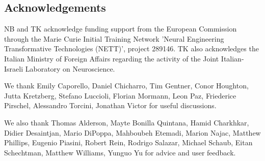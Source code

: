 \documentclass[10pt,twocolumn]{elsart5p}
\begin{document}
\begin{thanks}
\section{\label{s:Acknowledgement} \textbf{Acknowledgements}}
NB and TK acknowledge funding support from the European Commission through the Marie Curie Initial Training Network 'Neural Engineering Transformative Technologies (NETT)', project 289146. TK also acknowledges the Italian Ministry of Foreign Affairs regarding the activity of the Joint Italian-Israeli Laboratory on Neuroscience. 
     
We thank Emily Caporello, Daniel Chicharro, Tim Gentner, Conor Houghton, Jutta Kretzberg, Stefano Luccioli, Florian Mormann, Leon Paz, Friederice Pirschel, Alessandro Torcini, Jonathan Victor for useful discussions.

We also thank Thomas Alderson, Mayte Bonilla Quintana, Hamid Charkhkar, Didier Desaintjan, Mario DiPoppa, Mahboubeh Etemadi, Marion Najac, Matthew Phillips, Eugenio Piasini, Robert Rein, Rodrigo Salazar, Michael Schaub, Eitan Schechtman, Matthew Williams, Yunguo Yu for advice and user feedback.
     
\end{thanks}




%

\end{document}
